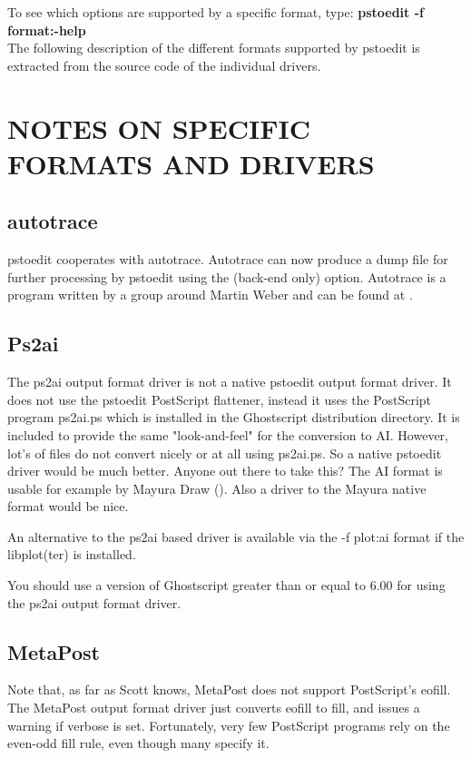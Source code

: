 \documentclass[english,a4paper]{article}
\begin{document}

To see which options are supported by a specific format, type:
     \textbf{pstoedit -f format:-help}
     \\

The following description of the different formats supported by pstoedit is extracted from the source code of the individual drivers.



\section{NOTES ON SPECIFIC FORMATS AND DRIVERS}
  \subsection{autotrace}
    pstoedit cooperates with autotrace. Autotrace can now produce a dump file
    for further processing by pstoedit using the  (back-end only) option.
    Autotrace is a program written by a group around Martin Weber and can be
    found at .

  \subsection{Ps2ai}
    The ps2ai output format driver is not a native pstoedit output format driver. It does not use the
    pstoedit PostScript flattener, instead it uses the PostScript program
    ps2ai.ps which is installed in the Ghostscript distribution directory. It
    is included to provide the same "look-and-feel" for the conversion to AI.
    However, lot's of files do not
    convert nicely or at all using ps2ai.ps. So a native pstoedit driver would
    be much better. Anyone out there to take this? The AI format is usable for
    example by Mayura Draw (). Also a driver to the
    Mayura native format would be nice.

    An alternative to the ps2ai based driver is available via the -f plot:ai format if the libplot(ter) is installed.

    You should use a version of Ghostscript greater than or equal to 6.00 for using the ps2ai output format driver.


  \subsection{MetaPost}
    Note that, as far as Scott knows, MetaPost does not support PostScript's
    eofill. The MetaPost output format driver just converts eofill to fill, and issues a warning if
    verbose is set. Fortunately, very few PostScript programs rely on the
    even-odd fill rule, even though many specify it.
\end{document}
